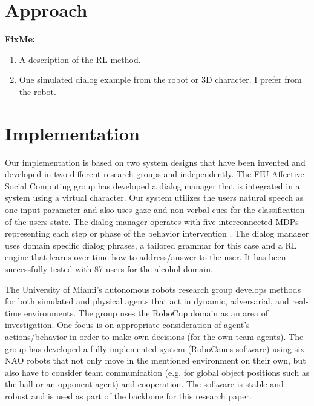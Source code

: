 \documentclass[letterpaper]{article}
\begin{document}
\section*{Approach}

{ \color{red}
\textbf{FixMe:}
\begin{enumerate}
 \item A description of the RL method. 
 \item One simulated dialog example from the robot or 3D character. I prefer from the robot. 
\end{enumerate}
}


\section*{Implementation} 

Our implementation is based on two system designs that have been
invented and developed in two different research groups and independently. The FIU Affective Social Computing group has developed a dialog manager that is integrated in a system using a virtual 
character.  Our system utilizes the users natural speech as one input parameter and also uses gaze
and non-verbal cues for the classification of the users state. The dialog manager operates with five
interconnected MDPs representing each step or phase of the behavior intervention 
\cite{YASCLL14}. The dialog manager uses domain specific dialog phrases, a tailored grammar for
this case and a RL engine that learns over time how to address/answer to the user. It has been
successfully tested with 87 users for the alcohol domain.

The University of Miami's autonomous robots research group develops methods for both simulated and
physical agents that act in dynamic, adversarial, and real-time environments. The group uses the
RoboCup domain as an area of investigation. One  focus is on appropriate consideration of agent's
actions/behavior in order to make own decisions (for the own team agents). The group has developed a
fully implemented system (RoboCanes software) using six NAO robots that not only move in the
mentioned environment on their own, but also have to consider team communication (e.g. for global
object positions such as the ball or an opponent agent) and cooperation. The software is stable and
robust and is used as part of the backbone for this research paper.
\end{document}
